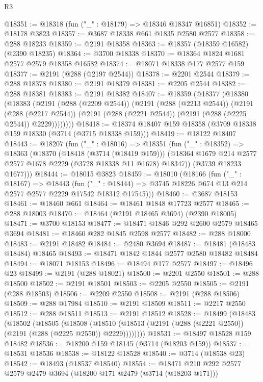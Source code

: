 \begin{lexlean}{R3}
\begin{coremodule}
@18351 := @18318 (fun ("_" : @18179) => @18346 @18347 @16851)
@18352 := @18178 @3823
@18357 := @3687 @18338 @661 @1835 @2580 @2577
@18358 := @288 @18233
@18359 := @2191 @18358
@18363 := @18357 (@18359 @16582) (@2390 @18235)
@18364 := @3700 @18338
@18370 := @18364 @1824 @1681 @2577 @2579 @18358 @16582
@18374 := @18071 @18338 @177 @2577 @159
@18377 := @2191 (@288 (@2197 @2544))
@18378 := @2201 @2544
@18379 := @288 @18378
@18380 := @2191 @18379
@18381 := @2205 @2544
@18382 := @288 @18381
@18383 := @2191 @18382
@18407 := @18359
    (@18377
      (@18380
        (@18383
          (@2191
            (@288 (@2209 @2544))
            (@2191
              (@288 (@2213 @2544))
              (@2191
                (@288 (@2217 @2544))
                (@2191 (@288 (@2221 @2544)) (@2191 (@288 (@2225 @2544)) @2229))))))))
@18418 := @18374 @18407 @159 @18358 (@3709 @18338 @159 @18330 (@3714 (@3715 @18338 @159)))
@18419 := @18122 @18407
@18443 := @18207
    (fun ("_" : @18016) =>
    @18351
      (fun ("_" : @18352) =>
      @18363
        (@18370
          (@18418 (@3714 (@18419 @159)))
          (@18364 @1679 @214 @2577 @2577 @1678 @2229 (@3728 @18338 @11 @1678) @18347))
        (@3739 @18233 @1677)))
@18444 := @18015 @3823
@18459 := @18010
    (@18166
      (fun ("_" : @18167) =>
      @18443
        (fun ("_" : @18444) => @3745 @18226 @674 @13 @214 @2577 @2577 @2229 @17542 @18312 @17545)))
@18460 := @3687 @18153
@18461 := @18460 @661
@18464 := @18461 @1848 @17723 @2577
@18465 := @288 @18003
@18470 := @18464 (@2191 @18465 @3694) (@2390 @18005)
@18471 := @3700 @18153
@18477 := @18471 @1846 @292 @2600 @2579 @18465 @3694
@18481 := @18460 @282 @1845 @2598 @2577
@18482 := @288 @18000
@18483 := @2191 @18482
@18484 := @2480 @3694
@18487 := @18481 (@18483 @18484) @18465
@18493 := @18471 @1842 @1844 @2577 @2580 @18482 @18484
@18494 := @18071 @18153
@18496 := @18494 @177 @2577
@18497 := @18496 @23
@18499 := @2191 (@288 @18021)
@18500 := @2201 @2550
@18501 := @288 @18500
@18502 := @2191 @18501
@18503 := @2205 @2550
@18505 := @2191 (@288 @18503)
@18506 := @2209 @2550
@18508 := @2191 (@288 @18506)
@18509 := @288 @17984
@18510 := @2191 @18509
@18511 := @2217 @2550
@18512 := @288 @18511
@18513 := @2191 @18512
@18528 := @18499
    (@18483
      (@18502
        (@18505
          (@18508
            (@18510 (@18513 (@2191 (@288 (@2221 @2550)) (@2191 (@288 (@2225 @2550)) @2229))))))))
@18531 := @18497 @18528 @159 @18482
@18536 := @18200 @159 @18145 (@3714 (@18203 @159))
@18537 := @18531 @18536
@18538 := @18122 @18528
@18540 := @3714 (@18538 @23)
@18542 := @18493 (@18537 @18540)
@18554 := @18471 @210 @292 @2577 @2579 @2479 @3694 (@18200 @171 @2479 (@3714 (@18203 @171)))

\end{coremodule}
\end{lexlean}
